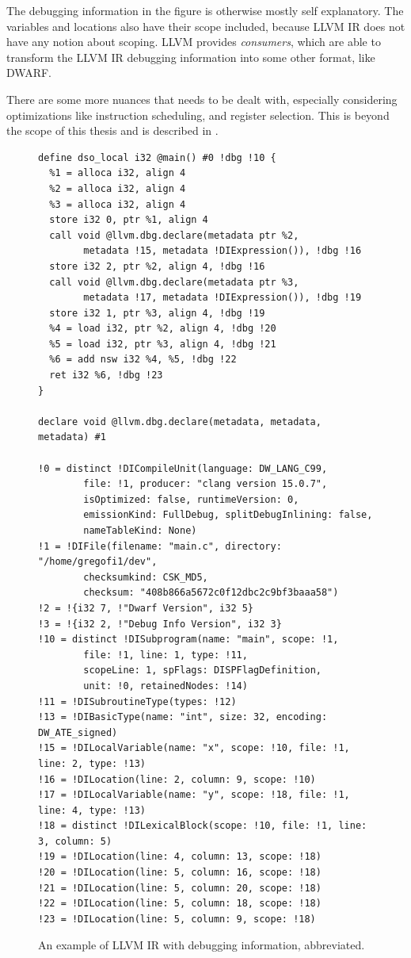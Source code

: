 The debugging information in the figure is otherwise mostly self explanatory.
The variables and locations also have their scope included, because LLVM IR
does not have any notion about scoping. LLVM provides \textit{consumers}, which
are able to transform the LLVM IR debugging information into some other format,
like DWARF.

There are some more nuances that needs to be dealt with, especially considering
optimizations like instruction scheduling, and register selection. This is
beyond the scope of this thesis and is described in \cite{llvm-debug-info}.

\begin{figure}
    \begin{verbatim}
define dso_local i32 @main() #0 !dbg !10 {
  %1 = alloca i32, align 4
  %2 = alloca i32, align 4
  %3 = alloca i32, align 4
  store i32 0, ptr %1, align 4
  call void @llvm.dbg.declare(metadata ptr %2,
        metadata !15, metadata !DIExpression()), !dbg !16
  store i32 2, ptr %2, align 4, !dbg !16
  call void @llvm.dbg.declare(metadata ptr %3,
        metadata !17, metadata !DIExpression()), !dbg !19
  store i32 1, ptr %3, align 4, !dbg !19
  %4 = load i32, ptr %2, align 4, !dbg !20
  %5 = load i32, ptr %3, align 4, !dbg !21
  %6 = add nsw i32 %4, %5, !dbg !22
  ret i32 %6, !dbg !23
}

declare void @llvm.dbg.declare(metadata, metadata, metadata) #1

!0 = distinct !DICompileUnit(language: DW_LANG_C99, 
        file: !1, producer: "clang version 15.0.7", 
        isOptimized: false, runtimeVersion: 0, 
        emissionKind: FullDebug, splitDebugInlining: false, 
        nameTableKind: None)
!1 = !DIFile(filename: "main.c", directory: "/home/gregofi1/dev",
        checksumkind: CSK_MD5,
        checksum: "408b866a5672c0f12dbc2c9bf3baaa58")
!2 = !{i32 7, !"Dwarf Version", i32 5}
!3 = !{i32 2, !"Debug Info Version", i32 3}
!10 = distinct !DISubprogram(name: "main", scope: !1,
        file: !1, line: 1, type: !11,
        scopeLine: 1, spFlags: DISPFlagDefinition,
        unit: !0, retainedNodes: !14)
!11 = !DISubroutineType(types: !12)
!13 = !DIBasicType(name: "int", size: 32, encoding: DW_ATE_signed)
!15 = !DILocalVariable(name: "x", scope: !10, file: !1, line: 2, type: !13)
!16 = !DILocation(line: 2, column: 9, scope: !10)
!17 = !DILocalVariable(name: "y", scope: !18, file: !1, line: 4, type: !13)
!18 = distinct !DILexicalBlock(scope: !10, file: !1, line: 3, column: 5)
!19 = !DILocation(line: 4, column: 13, scope: !18)
!20 = !DILocation(line: 5, column: 16, scope: !18)
!21 = !DILocation(line: 5, column: 20, scope: !18)
!22 = !DILocation(line: 5, column: 18, scope: !18)
!23 = !DILocation(line: 5, column: 9, scope: !18)
    \end{verbatim}
    \caption{An example of LLVM IR with debugging information, abbreviated.}
    \label{fig:llvm-ir-debug}
\end{figure}

